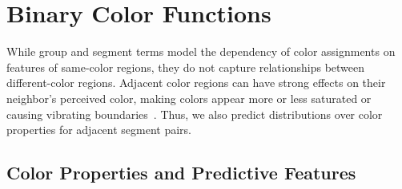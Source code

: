 \section{Binary Color Functions}
\label{sec:binary}

While group and segment terms model the dependency of color assignments on features of same-color regions, they do not capture relationships between different-color regions. Adjacent color regions can have strong effects on their neighbor's perceived color, making colors appear more or less saturated or causing vibrating boundaries~\cite{AlbersInteractionOfColor}. Thus, we also predict distributions over color properties for adjacent segment pairs.

\subsection{Color Properties and Predictive Features}
\label{sec:binaryPropsAndFeatures}

